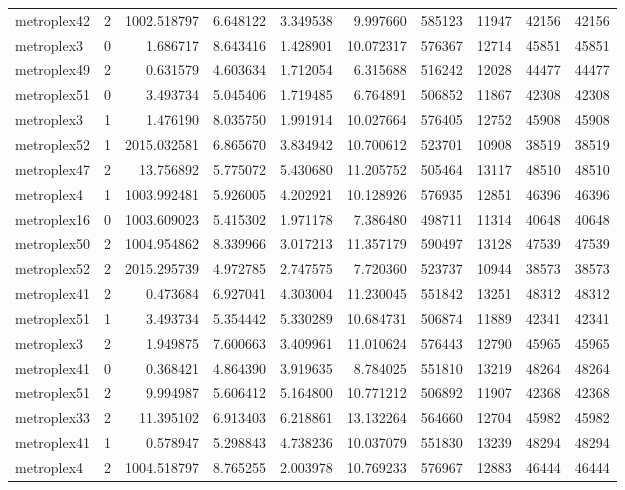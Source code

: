 \begin{longtable}{|l|r|r|r|r|r|r|r|r|r|}
metroplex42 & 2 & 1002.518797 & 6.648122 & 3.349538 & 9.997660 & 585123 & 11947 & 42156 & 42156 \\
metroplex3 & 0 & 1.686717 & 8.643416 & 1.428901 & 10.072317 & 576367 & 12714 & 45851 & 45851 \\
metroplex49 & 2 & 0.631579 & 4.603634 & 1.712054 & 6.315688 & 516242 & 12028 & 44477 & 44477 \\
metroplex51 & 0 & 3.493734 & 5.045406 & 1.719485 & 6.764891 & 506852 & 11867 & 42308 & 42308 \\
metroplex3 & 1 & 1.476190 & 8.035750 & 1.991914 & 10.027664 & 576405 & 12752 & 45908 & 45908 \\
metroplex52 & 1 & 2015.032581 & 6.865670 & 3.834942 & 10.700612 & 523701 & 10908 & 38519 & 38519 \\
metroplex47 & 2 & 13.756892 & 5.775072 & 5.430680 & 11.205752 & 505464 & 13117 & 48510 & 48510 \\
metroplex4 & 1 & 1003.992481 & 5.926005 & 4.202921 & 10.128926 & 576935 & 12851 & 46396 & 46396 \\
metroplex16 & 0 & 1003.609023 & 5.415302 & 1.971178 & 7.386480 & 498711 & 11314 & 40648 & 40648 \\
metroplex50 & 2 & 1004.954862 & 8.339966 & 3.017213 & 11.357179 & 590497 & 13128 & 47539 & 47539 \\
metroplex52 & 2 & 2015.295739 & 4.972785 & 2.747575 & 7.720360 & 523737 & 10944 & 38573 & 38573 \\
metroplex41 & 2 & 0.473684 & 6.927041 & 4.303004 & 11.230045 & 551842 & 13251 & 48312 & 48312 \\
metroplex51 & 1 & 3.493734 & 5.354442 & 5.330289 & 10.684731 & 506874 & 11889 & 42341 & 42341 \\
metroplex3 & 2 & 1.949875 & 7.600663 & 3.409961 & 11.010624 & 576443 & 12790 & 45965 & 45965 \\
metroplex41 & 0 & 0.368421 & 4.864390 & 3.919635 & 8.784025 & 551810 & 13219 & 48264 & 48264 \\
metroplex51 & 2 & 9.994987 & 5.606412 & 5.164800 & 10.771212 & 506892 & 11907 & 42368 & 42368 \\
metroplex33 & 2 & 11.395102 & 6.913403 & 6.218861 & 13.132264 & 564660 & 12704 & 45982 & 45982 \\
metroplex41 & 1 & 0.578947 & 5.298843 & 4.738236 & 10.037079 & 551830 & 13239 & 48294 & 48294 \\
metroplex4 & 2 & 1004.518797 & 8.765255 & 2.003978 & 10.769233 & 576967 & 12883 & 46444 & 46444 \\

\end{longtable}
